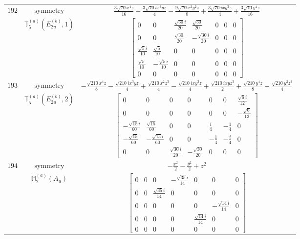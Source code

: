 \documentclass[fleqn,8pt,landscape]{jsarticle}
\begin{document}
\begin{longtable}{ccc}
$ 192 $ & $ \text{symmetry} $ & $ \frac{3 \sqrt{70} x^{4} z}{16} - \frac{3 \sqrt{70} i x^{3} y z}{4} - \frac{9 \sqrt{70} x^{2} y^{2} z}{8} + \frac{3 \sqrt{70} i x y^{3} z}{4} + \frac{3 \sqrt{70} y^{4} z}{16} $ \\
$  $ & $ \mathbb{T}_{5}^{(a)}(E_{2u}^{(b)},1) $ & $ \begin{bmatrix} 0 & 0 & \frac{\sqrt{30} i}{20} & \frac{\sqrt{30}}{20} & 0 & 0 & 0 \\ 0 & 0 & \frac{\sqrt{30}}{20} & - \frac{\sqrt{30} i}{20} & 0 & 0 & 0 \\ \frac{\sqrt{5} i}{10} & \frac{\sqrt{5}}{10} & 0 & 0 & 0 & 0 & 0 \\ \frac{\sqrt{5}}{10} & - \frac{\sqrt{5} i}{10} & 0 & 0 & 0 & 0 & 0 \\ 0 & 0 & 0 & 0 & 0 & 0 & 0 \end{bmatrix} $ \\ \hline
$ 193 $ & $ \text{symmetry} $ & $ - \frac{\sqrt{210} x^{4} z}{8} - \frac{\sqrt{210} i x^{3} y z}{4} + \frac{\sqrt{210} x^{2} z^{3}}{4} - \frac{\sqrt{210} i x y^{3} z}{4} + \frac{\sqrt{210} i x y z^{3}}{2} + \frac{\sqrt{210} y^{4} z}{8} - \frac{\sqrt{210} y^{2} z^{3}}{4} $ \\
$  $ & $ \mathbb{T}_{5}^{(a)}(E_{2u}^{(b)},2) $ & $ \begin{bmatrix} 0 & 0 & 0 & 0 & 0 & 0 & \frac{\sqrt{6} i}{12} \\ 0 & 0 & 0 & 0 & 0 & 0 & - \frac{\sqrt{6}}{12} \\ - \frac{\sqrt{15} i}{60} & \frac{\sqrt{15}}{60} & 0 & 0 & \frac{i}{4} & - \frac{1}{4} & 0 \\ - \frac{\sqrt{15}}{60} & - \frac{\sqrt{15} i}{60} & 0 & 0 & - \frac{1}{4} & - \frac{i}{4} & 0 \\ 0 & 0 & \frac{\sqrt{30} i}{20} & - \frac{\sqrt{30}}{20} & 0 & 0 & 0 \end{bmatrix} $ \\ \hline
$ 194 $ & $ \text{symmetry} $ & $ - \frac{x^{2}}{2} - \frac{y^{2}}{2} + z^{2} $ \\
$  $ & $ \mathbb{M}_{2}^{(a)}(A_{u}) $ & $ \begin{bmatrix} 0 & 0 & 0 & - \frac{\sqrt{35} i}{14} & 0 & 0 & 0 \\ 0 & 0 & \frac{\sqrt{35} i}{14} & 0 & 0 & 0 & 0 \\ 0 & 0 & 0 & 0 & 0 & - \frac{\sqrt{14} i}{14} & 0 \\ 0 & 0 & 0 & 0 & \frac{\sqrt{14} i}{14} & 0 & 0 \\ 0 & 0 & 0 & 0 & 0 & 0 & 0 \end{bmatrix} $ \\ \hline

\end{longtable}
\end{document}
